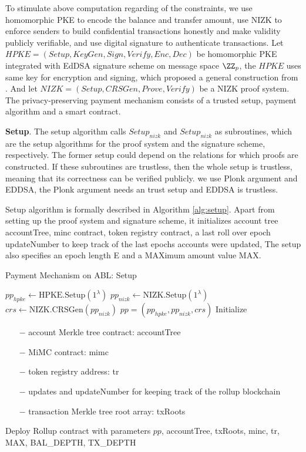 \documentclass{article}
\begin{document}
To stimulate above computation regarding of the constraints, we use homomorphic PKE to encode the balance and transfer amount, use NIZK to enforce senders to build confidential transactions honestly and make validity publicly verifiable, and use digital signature to authenticate transactions. Let $HPKE = (Setup, KeyGen, Sign, Verify, Enc, Dec)$ be homomorphic PKE integrated with EdDSA signature scheme on message space $\ZZ_p$, the $HPKE$ uses same key for encryption and signing, which proposed a general construction from \cite{paterson2011joint}. And let $NIZK = (Setup, CRSGen, Prove, Verify)$ be a NIZK proof system. The privacy-preserving payment mechanism consists of a trusted setup, payment algorithm and a smart contract.

\textbf{Setup}. The setup algorithm calls $Setup_{nizk}$ and $Setup_{nizk}$ as subroutines, which are the setup algorithms for the proof system and the signature scheme, respectively. The former setup could depend on the relations for which proofs are constructed. If these subroutines are trustless, then the whole setup is trustless, meaning that its correctness can be verified publicly. we use Plonk argument and EDDSA, the Plonk argument needs an trust setup and EDDSA is trustless.

Setup algorithm is formally described in Algorithm \ref{alg:setup}. Apart from setting up the proof system and signature scheme, it initializes account tree accountTree, minc contract, token registry contract, a last roll over epoch updateNumber to keep track of the last epochs accounts were updated, The setup also specifies an epoch length E and a \mbox{MAX}imum amount value \mbox{MAX}.

\begin{algorithm}
 \caption{Payment Mechanism on ABL: Setup}
    \label{alg:setup}
    \LinesNumbered
    
    $pp_{hpke} \gets \mbox{HPKE.Setup}(1^\lambda)$ \;
    $pp_{nizk} \gets \mbox{NIZK.Setup}(1^\lambda)$ \;
    $crs \gets \mbox{NIZK.CRSGen}(pp_{nizk})$ \;
    $pp = (pp_{hpke}, pp_{nizk}, crs)$ \;
    Initialize {
        \begin{itemize}
            \item[$-$] account Merkle tree contract: accountTree
            \item[$-$] MiMC contract: mimc
            \item[$-$] token registry address: tr
            \item[$-$] updates and updateNumber for keeping track of the rollup blockchain
            \item[$-$] transaction Merkle tree root array: txRoots
        \end{itemize}
    }
    Deploy Rollup contract with parameters $pp$, accountTree, txRoots, minc, tr, \mbox{MAX}, BAL\_DEPTH, TX\_DEPTH
    
\end{algorithm}
\end{document}
